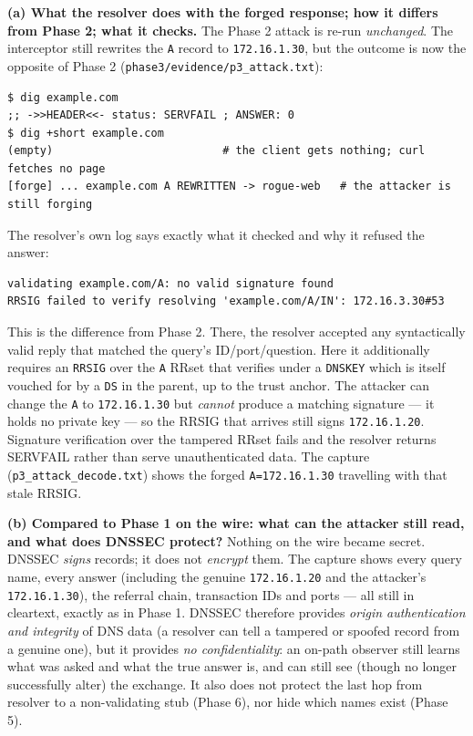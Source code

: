 \documentclass[11pt,a4paper]{article}
\begin{document}
\textbf{(a) What the resolver does with the forged response; how it differs from Phase 2; what it
checks.} The Phase 2 attack is re-run \emph{unchanged}. The interceptor still rewrites the
\texttt{A} record to \texttt{172.16.1.30}, but the outcome is now the opposite of Phase 2
(\texttt{phase3/evidence/p3\_attack.txt}):
\begin{lstlisting}
$ dig example.com
;; ->>HEADER<<- status: SERVFAIL ; ANSWER: 0
$ dig +short example.com
(empty)                          # the client gets nothing; curl fetches no page
[forge] ... example.com A REWRITTEN -> rogue-web   # the attacker is still forging
\end{lstlisting}
The resolver's own log says exactly what it checked and why it refused the answer:
\begin{lstlisting}
validating example.com/A: no valid signature found
RRSIG failed to verify resolving 'example.com/A/IN': 172.16.3.30#53
\end{lstlisting}
This is the difference from Phase 2. There, the resolver accepted any syntactically valid reply
that matched the query's ID/port/question. Here it additionally requires an \texttt{RRSIG} over the
\texttt{A} RRset that verifies under a \texttt{DNSKEY} which is itself vouched for by a \texttt{DS}
in the parent, up to the trust anchor. The attacker can change the \texttt{A} to \texttt{172.16.1.30}
but \emph{cannot} produce a matching signature --- it holds no private key --- so the RRSIG that
arrives still signs \texttt{172.16.1.20}. Signature verification over the tampered RRset fails and
the resolver returns SERVFAIL rather than serve unauthenticated data. The capture
(\texttt{p3\_attack\_decode.txt}) shows the forged \texttt{A=172.16.1.30} travelling with that stale
RRSIG.

\textbf{(b) Compared to Phase 1 on the wire: what can the attacker still read, and what does
DNSSEC protect?} Nothing on the wire became secret. DNSSEC \emph{signs} records; it does not
\emph{encrypt} them. The capture shows every query name, every answer (including the genuine
\texttt{172.16.1.20} and the attacker's \texttt{172.16.1.30}), the referral chain, transaction IDs
and ports --- all still in cleartext, exactly as in Phase 1. DNSSEC therefore provides
\emph{origin authentication and integrity} of DNS data (a resolver can tell a tampered or spoofed
record from a genuine one), but it provides \emph{no confidentiality}: an on-path observer still
learns what was asked and what the true answer is, and can still see (though no longer successfully
alter) the exchange. It also does not protect the last hop from resolver to a non-validating stub
(Phase 6), nor hide which names exist (Phase 5).
\end{document}
